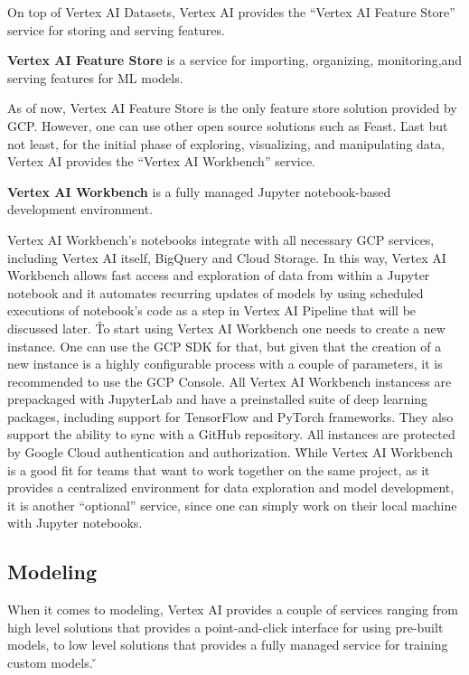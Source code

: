 On top of Vertex AI Datasets, Vertex AI provides the ``Vertex AI Feature Store'' service for storing and serving
features.

\textbf{Vertex AI Feature Store} is a service for importing, organizing, monitoring,and serving features for ML models.
\ed

As of now, Vertex AI Feature Store is the only feature store solution provided by GCP\@. However, one can use other
open source solutions such as Feast. \v

Last but not least, for the initial phase of exploring, visualizing, and manipulating data, Vertex AI provides the
``Vertex AI Workbench'' service.

\textbf{Vertex AI Workbench} is a fully managed Jupyter notebook-based development environment.
\ed

Vertex AI Workbench's notebooks integrate with all necessary GCP services, including Vertex AI itself, BigQuery and
Cloud Storage. In this way, Vertex AI Workbench allows fast access and exploration of data from within a Jupyter
notebook and it automates recurring updates of models by using scheduled executions of notebook's code as a step in
Vertex AI Pipeline that will be discussed later. \v

To start using Vertex AI Workbench one needs to create a new instance. One can use the GCP SDK for that, but given
that the creation of a new instance is a highly configurable process with a couple of parameters, it is recommended
to use the GCP Console. All Vertex AI Workbench instancess are prepackaged with JupyterLab and have a preinstalled
suite of deep learning packages, including support for TensorFlow and PyTorch frameworks. They also support the
ability to sync with a GitHub repository. All instances are protected by Google Cloud authentication and authorization.
\v

While Vertex AI Workbench is a good fit for teams that want to work together on the same project, as it provides a
centralized environment for data exploration and model development, it is another ``optional'' service, since one can
simply work on their local machine with Jupyter notebooks.

\subsection{Modeling}

When it comes to modeling, Vertex AI provides a couple of services ranging from high level solutions that provides a
point-and-click interface for using pre-built models, to low level solutions that provides a fully managed service for
training custom models. \v

